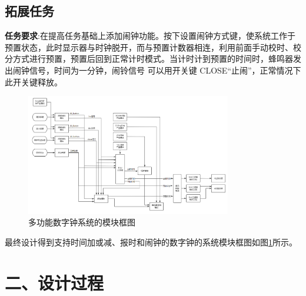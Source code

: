 \documentclass{article}
\newcommand{\fourhao}{\fontsize{14pt}{\baselineskip}\selectfont} %
\newcommand{\xiaosihao}{\fontsize{12pt}{\baselineskip}\selectfont} %
\begin{document}
\subsection*{拓展任务}
\textbf{任务要求}:在提高任务基础上添加闹钟功能。按下设置闹钟方式键，使系统工作于预置状态，此时显示器与时钟脱开，而与预置计数器相连，利用前面手动校时、校分方式进行预置，预置后回到正常计时模式。当计时计到预置的时间时，蜂鸣器发出闹钟信号，时间为一分钟，闹铃信号
可以用开关键 CLOSE“止闹”，正常情况下此开关键释放。\\
\begin{figure}[htbp]
    \centering
    \includegraphics[width=0.8\textwidth]{image/2024-06-28-18-09-11.png}
    \caption{多功能数字钟系统的模块框图}
    \label{image_principle_1}
\end{figure}
最终设计得到支持时间加或减、报时和闹钟的数字钟的系统模块框图如图\ref{image_principle_1}所示。
\section*{\fourhao 二、设计过程}
\xiaosihao
{}
\end{document}
